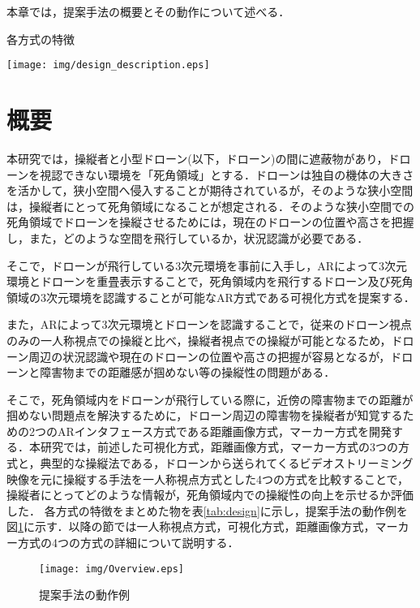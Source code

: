 \documentclass
[a4paper,11pt]{jreport}
\begin{document}
本章では，提案手法の概要とその動作について述べる．


\begin{table}[bt]
	\caption{各方式の特徴}
	\begin{center}
    \texttt{[image: img/design\_description.eps]}
    \label{tab:design}
    \end{center}
\end{table}




\section{概要}
本研究では，操縦者と小型ドローン(以下，ドローン)の間に遮蔽物があり，ドローンを視認できない環境を「死角領域」とする．ドローンは独自の機体の大きさを活かして，狭小空間へ侵入することが期待されているが，そのような狭小空間は，操縦者にとって死角領域になることが想定される．そのような狭小空間での死角領域でドローンを操縦させるためには，現在のドローンの位置や高さを把握し，また，どのような空間を飛行しているか，状況認識が必要である．
\par
そこで，ドローンが飛行している3次元環境を事前に入手し，ARによって3次元環境とドローンを重畳表示することで，死角領域内を飛行するドローン及び死角領域の3次元環境を認識することが可能なAR方式である可視化方式を提案する．
\par
また，ARによって3次元環境とドローンを認識することで，従来のドローン視点のみの一人称視点での操縦と比べ，操縦者視点での操縦が可能となるため，ドローン周辺の状況認識や現在のドローンの位置や高さの把握が容易となるが，ドローンと障害物までの距離感が掴めない等の操縦性の問題がある．
\par
そこで，死角領域内をドローンが飛行している際に，近傍の障害物までの距離が掴めない問題点を解決するために，ドローン周辺の障害物を操縦者が知覚するための2つのARインタフェース方式である距離画像方式，マーカー方式を開発する．本研究では，前述した可視化方式，距離画像方式，マーカー方式の3つの方式と，典型的な操縦法である，ドローンから送られてくるビデオストリーミング映像を元に操縦する手法を一人称視点方式とした4つの方式を比較することで，操縦者にとってどのような情報が，死角領域内での操縦性の向上を示せるか評価した．
各方式の特徴をまとめた物を表\ref{tab:design}に示し，提案手法の動作例を図\ref{tab:overview}に示す．以降の節では一人称視点方式，可視化方式，距離画像方式，マーカー方式の4つの方式の詳細について説明する．


\begin{figure}[p]
	\begin{center}
    \texttt{[image: img/Overview.eps]}
    \caption{提案手法の動作例}
    \label{tab:overview}
    \end{center}
\end{figure}
\end{document}
